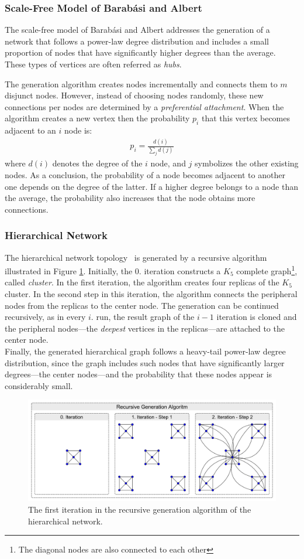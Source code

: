 \subsubsection{Scale-Free Model of Barabási and Albert}

The scale-free model of Barabási and Albert addresses the generation of a network that follows a power-law degree distribution and includes a small proportion of nodes that have significantly higher degrees than the average. These types of vertices are often referred as \textit{hubs}.

The generation algorithm creates nodes incrementally and connects them to $m$ disjunct nodes. However, instead of choosing nodes randomly, these new connections per nodes are determined by a \textit{preferential attachment}. When the algorithm creates a new vertex then the probability $p_i$ that this vertex becomes adjacent to an $i$ node is:
\begin{align}
	p_i = \frac{d(i)}{\sum_j d(j)}
\end{align}
where $d(i)$ denotes the degree of the $i$ node, and $j$ symbolizes the other existing nodes. As a conclusion, the probability of a node becomes adjacent to another one depends on the degree of the latter. If a higher degree belongs to a node than the average, the probability also increases that the node obtains more connections.
\subsubsection{Hierarchical Network}

The hierarchical network topology~\cite{hierarchical} is generated by a recursive algorithm illustrated in Figure \ref{fig:hierarchical_generation}. Initially, the $0.$ iteration constructs a $K_5$ complete graph\footnote{The diagonal nodes are also connected to each other}, called \textit{cluster}. In the first iteration, the algorithm creates four replicas of the $K_5$ cluster. In the second step in this iteration, the algorithm connects the peripheral nodes from the replicas to the center node. The generation can be continued recursively, as in every $i.$ run, the result graph of the $i-1$ iteration is cloned and the peripheral nodes---the \textit{deepest} vertices in the replicas---are attached to the center node.\\
Finally, the generated hierarchical graph follows a heavy-tail power-law degree distribution, since the graph includes such nodes that have significantly larger degrees---the center nodes---and the probability that these nodes appear is considerably small.

\begin{figure}[!ht]
	\centering
	\includegraphics[width=140mm, keepaspectratio]{figures/hierarchical_generation.pdf}
	\caption{The first iteration in the recursive generation algorithm of the hierarchical network.}
	\label{fig:hierarchical_generation}
\end{figure}
